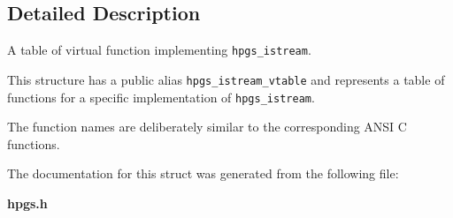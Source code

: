 \subsection{Detailed Description}
A table of virtual function implementing {\tt hpgs\_\-istream}. 

This structure has a public alias {\tt hpgs\_\-istream\_\-vtable} and represents a table of functions for a specific implementation of {\tt hpgs\_\-istream}.

The function names are deliberately similar to the corresponding ANSI C functions. 

The documentation for this struct was generated from the following file:\begin{CompactItemize}
\item 
{\bf hpgs.h}\end{CompactItemize}
